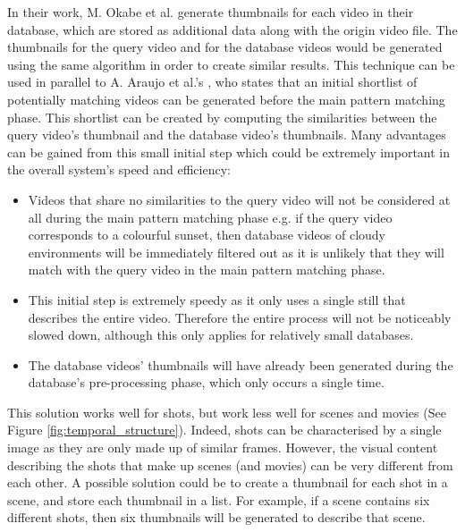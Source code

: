 In their work, M. Okabe et al. \cite{okabe2018animating} generate thumbnails for each video in their database, which are stored as additional data along with the origin video file. The thumbnails for the query video and for the database videos would be generated using the same algorithm in order to create similar results. This technique can be used in parallel to A. Araujo et al.'s \cite{araujo2017i2v}, who states that an initial shortlist of potentially matching videos can be generated before the main pattern matching phase. This shortlist can be created by computing the similarities between the query video's thumbnail and the database video's thumbnails. Many advantages can be gained from this small initial step which could be extremely important in the overall system's speed and efficiency:
\begin{itemize}
    \item Videos that share no similarities to the query video will not be considered at all during the main pattern matching phase e.g. if the query video corresponds to a colourful sunset, then database videos of cloudy environments will be immediately filtered out as it is unlikely that they will match with the query video in the main pattern matching phase.
    \item This initial step is extremely speedy as it only uses a single still that describes the entire video. Therefore the entire process will not be noticeably slowed down, although this only applies for relatively small databases.
    \item The database videos' thumbnails will have already been generated during the database's pre-processing phase, which only occurs a single time.
\end{itemize}

This solution works well for shots, but work less well for scenes and movies (See Figure \ref{fig:temporal_structure}). Indeed, shots can be characterised by a single image as they are only made up of similar frames. However, the visual content describing the shots that make up scenes (and movies) can be very different from each other. A possible solution could be to create a thumbnail for each shot in a scene, and store each thumbnail in a list. For example, if a scene contains six different shots, then six thumbnails will be generated to describe that scene.\\

